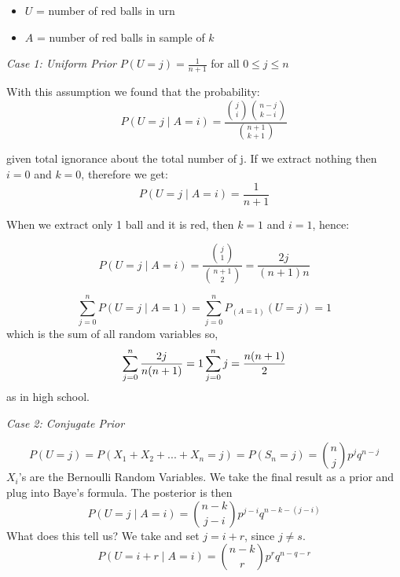 \begin{itemize}
\item $U$ = number of red balls in urn
\item $A$ = number of red balls in sample of $k$
\end{itemize}

{\em Case 1: {\em Uniform Prior}}
$P(U = j) = \frac {1} {n+1}$ for all $0 \leq j \leq n$

With this assumption we found that the probability:
\begin{displaymath}
P(U=j \mid A=i) = \frac { {j\choose i}{{n-j}\choose{k-i}}}{{{n+1}\choose{k+1}}}
\end{displaymath}

given total ignorance about the total number of j.  If we extract nothing
then $i=0$ and $k=0$, therefore we get:
\begin{displaymath}
P(U=j \mid A=i) = \frac {1} {n+1}
\end{displaymath}

When we extract only 1 ball and it is red, then $k=1$ and $i=1$, hence:

\begin{displaymath}
P(U=j \mid A=i) = \frac{{{j}\choose {1}}} {{{n+1}\choose {2}}}= \frac {2j}{(n+1)n}
\end{displaymath}

\begin{displaymath}
\sum_{j=0}^{n} P(U=j \mid A=1) = \sum_{j=0}^{n} P_{(A=1)} (U=j) = 1
\end{displaymath}
which is the sum of all random variables so,
\begin{displaymath}
\sum_{j=0}^{n} \frac{2j}{n(n+1)} = 1\\
\sum_{j=0}^{n} j = \frac{n(n+1)}{2}
\end{displaymath}
as in high school.

{\em Case 2:  {\em Conjugate Prior}}

\begin{displaymath}
P(U=j) = P (X_1 + X_2 + ...+ X_n = j)
       = P(S_n = j) = {n\choose j} p^j q^{n-j}
\end{displaymath}
$X_i$'s are the Bernoulli Random Variables.  We take the final result as a prior and plug into Baye's formula.  The posterior is then
\begin{displaymath}
P(U=j \mid A=i) = {{n-k}\choose{j-i}}p^{j-i} q^{n-k-(j-i)}
\end{displaymath}
What does this tell us?  We take and set $j=i+r$, since $j \neq s$.
\begin{displaymath} 
P(U=i+r \mid A=i) = {{n-k}\choose{r}}p^r q^{n-q-r}
\end{displaymath}


